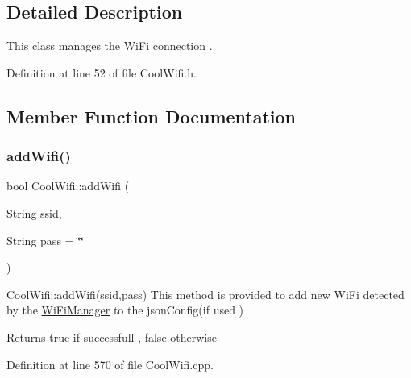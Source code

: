 \subsection{Detailed Description}
This class manages the Wi\+Fi connection . 

Definition at line 52 of file Cool\+Wifi.\+h.



\subsection{Member Function Documentation}
\mbox{\label{class_cool_wifi_a914d7a1df14dd6b75345fb614c34e9d6}} 
\subsubsection{\texorpdfstring{add\+Wifi()}{addWifi()}}
{\footnotesize\ttfamily bool Cool\+Wifi\+::add\+Wifi (\begin{DoxyParamCaption}\item[{String}]{ssid,  }\item[{String}]{pass = {\ttfamily \char`\"{}\char`\"{}} }\end{DoxyParamCaption})}

Cool\+Wifi\+::add\+Wifi(ssid,pass) This method is provided to add new Wi\+Fi detected by the \hyperlink{class_wi_fi_manager}{Wi\+Fi\+Manager} to the json\+Config(if used )

\begin{DoxyReturn}{Returns}
true if successfull , false otherwise 
\end{DoxyReturn}


Definition at line 570 of file Cool\+Wifi.\+cpp.


